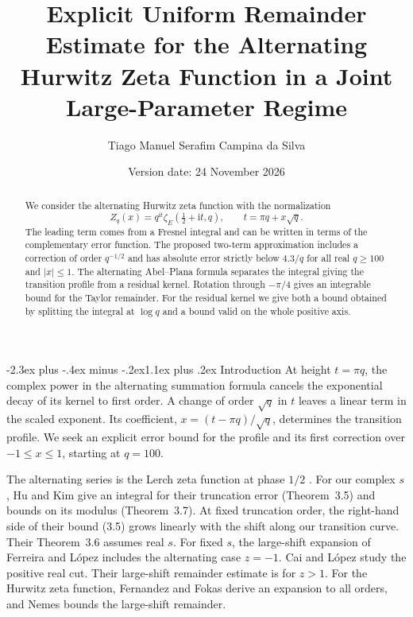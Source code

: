 \documentclass[11pt,a4paper]{article}
\title{Explicit Uniform Remainder Estimate for the Alternating Hurwitz Zeta Function in a Joint Large-Parameter Regime}
\author{Tiago Manuel Serafim Campina da Silva}
\date{\small Version date: 24 November 2026}
\makeatletter
\newcommand{\ii}{\mathrm i}
\renewcommand\section{\@startsection{section}{1}{\z@}
  {-2.3ex plus -.4ex minus -.2ex}{1.1ex plus .2ex}
  {\normalfont\large\bfseries\centering}}
\makeatother
\begin{document}
\maketitle
{}
\begin{abstract}
We consider the alternating Hurwitz zeta function with the normalization
\[
 Z_q(x)=q^{\ii t}\zeta_E\!\left(\tfrac12+\ii t,q\right),
 \qquad t=\pi q+x\sqrt q .
\]
The leading term comes from a Fresnel integral and can be written in terms of the
complementary error function. The proposed two-term approximation includes a correction of order
$q^{-1/2}$ and has absolute error strictly below
$4.3/q$ for all real $q\ge100$ and $|x|\le1$.
The alternating Abel--Plana formula separates the integral giving the
transition profile from a residual kernel. Rotation through $-\pi/4$
gives an integrable bound for the Taylor remainder. For the residual
kernel we give both a bound obtained by splitting the integral at
$\log q$ and a bound valid on the whole positive axis.
\end{abstract}

\section{Introduction}
At height $t=\pi q$, the complex power in the alternating summation
formula cancels the exponential decay of its kernel to first order.
A change of order $\sqrt q$ in $t$ leaves a linear term in the scaled
exponent. Its coefficient, $x=(t-\pi q)/\sqrt q$, determines the
transition profile. We seek an explicit error bound for the profile
and its first correction over $-1\le x\le1$, starting at $q=100$.

The alternating series is the Lerch zeta function at phase $1/2$
\cite{Apostol1951,DLMF2026}. For our complex $s$, Hu and Kim \cite{HuKim2024}
give an integral for their truncation error (Theorem~3.5) and bounds on
its modulus (Theorem~3.7). At fixed truncation order, the right-hand
side of their bound (3.5) grows linearly with the shift along our
transition curve. Their Theorem~3.6 assumes real $s$.
For fixed $s$, the large-shift expansion of Ferreira and López
\cite{FerreiraLopez2004} includes the alternating case $z=-1$.
Cai and López \cite{CaiLopez2019} study the positive real cut. Their
large-shift remainder estimate is for $z>1$. For the Hurwitz zeta function,
Fernandez and Fokas \cite{FernandezFokas2018} derive an expansion to all
orders, and Nemes \cite{Nemes2017} bounds the large-shift remainder.
\end{document}
